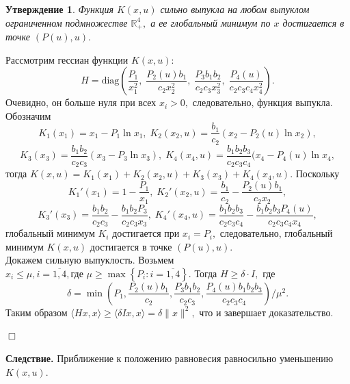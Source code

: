 \documentclass[11pt]{article}
\newtheorem{statement}{Утверждение}
\theoremstyle{definition}
\newenvironment{Proof}
{\par\noindent{\bf Доказательство.\\}} 
{\begin{flushright}$\Box$\end{flushright}}
\newcommand\Set[2]{\left\{ #1 \colon #2 \right\}}
\newcommand\ftw[2]{\overline{#1,#2}}
\begin{document}
\begin{statement}
\label{conv}
	Функция $K(x,u)$ сильно выпукла на любом выпуклом ограниченном подмножестве $\mathbb{R}_+^4,$ а ее глобальный минимум по $x$ достигается в точке $(P(u),u).$
\end{statement}
\begin{Proof}
	Рассмотрим гессиан функции $K(x,u):$
	$$H = \text{diag} \left(\frac{P_1}{x_1^2}, \; \frac{P_2(u)b_1}{c_2x_2^2}, \; \frac{P_3b_1b_2}{c_2c_3x_3^2}, \; \frac{P_4(u)}{c_2c_3c_4x_4^2}\right).$$
	Очевидно, он больше нуля при всех $x_i > 0,$ следовательно, функция выпукла.\\
	Обозначим 
	$$K_1(x_1) = x_1 - P_1\ln x_1, \; K_2(x_2,u) = \frac{b_1}{c_2}(x_2 - P_2(u)\ln x_2),$$
	$$K_3(x_3) = \frac{b_1b_2}{c_2c_3}(x_3 - P_3\ln x_3), \; K_4(x_4,u) = \frac{b_1b_2b_3}{c_2c_3c_4}(x_4 - P_4(u)\ln x_4,$$ тогда $K(x,u) =  K_1(x_1) + K_2(x_2,u) + K_3(x_3) + K_4(x_4,u).$  Поскольку 
	$$K_1'(x_1) = 1 - \frac{P_1}{x_1}, \; K_2'(x_2,u) = \frac{b_1}{c_2} - \frac{P_2(u)b_1}{c_2x_2},$$
	$$K_3'(x_3) = \frac{b_1b_2}{c_2c_3} - \frac{b_1b_2P_3}{c_2c_3x_3}, \; K_4'(x_4,u) = \frac{b_1b_2b_3}{c_2c_3c_4} - \frac{b_1b_2b_3P_4(u)}{c_2c_3c_4x_4},$$ 
	глобальный минимум $K_i$ достигается при $x_i = P_i,$ следовательно, глобальный минимум $K(x,u)$ достигается в точке $(P(u),u).$ \\
	 Докажем сильную выпуклость. Возьмем $x_i \leqslant \mu, i = \ftw{1}{4}, \text{где } \mu \geqslant \max\Set{P_i}{i = \ftw{1}{4}}.$ Тогда $H \geqslant \delta\cdot I,$ где  
	 $$\delta = \min\left(P_1, \frac{P_2(u)b_1}{c_2}, \frac{P_3b_1b_2}{c_2c_3}, \frac{P_4(u)b_1b_2b_3}{c_2c_3c_4}\right)/\mu^2.$$
	 Таким образом $\langle Hx,x \rangle \geqslant \langle \delta Ix,x \rangle = \delta \|x\|^2,$ что и завершает доказательство.
\end{Proof}

{\bf Следствие.} Приближение к положению равновесия равносильно уменьшению $K(x,u).$
\end{document}
